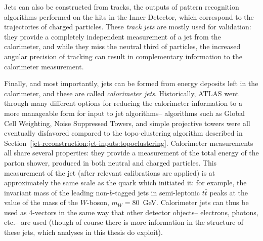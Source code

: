 Jets can also be constructed from tracks, the outputs of pattern recognition algorithms performed on the hits in the Inner Detector, which correspond to the trajectories of charged particles. These \textit{track jets} are mostly used for validation: they provide a completely independent measurement of a jet from the calorimeter, and while they miss the neutral third of particles, the increased angular precision of tracking can result in complementary information to the calorimeter measurement.  

Finally, and most importantly, jets can be formed from energy deposits left in the calorimeter, and these are called \textit{calorimeter jets}. Historically, ATLAS went through many different options for reducing the calorimeter information to a more manageable form for input to jet algorithms-- algorithms such as Global Cell Weighting, Noise Suppressed Towers, and simple projective towers were all eventually disfavored compared to the topo-clustering algorithm described in Section~\ref{jet-reconstruction:jet-inputs:topoclustering}. Calorimeter measurements all share several properties: they provide a measurement of the total energy of the parton shower, produced in both neutral and charged particles. This measurement of the jet (after relevant calibrations are applied) is at approximately the same scale as the quark which initiated it: for example, the invariant mass of the leading non-$b$-tagged jets in semi-leptonic $t\bar{t}$ peaks at the value of the mass of the $W$-boson, $m_{W} = 80$~GeV. Calorimeter jets can thus be used as 4-vectors in the same way that other detector objects-- electrons, photons, etc.-- are used (though of course there is more information in the structure of these jets, which analyses in this thesis do exploit).  

